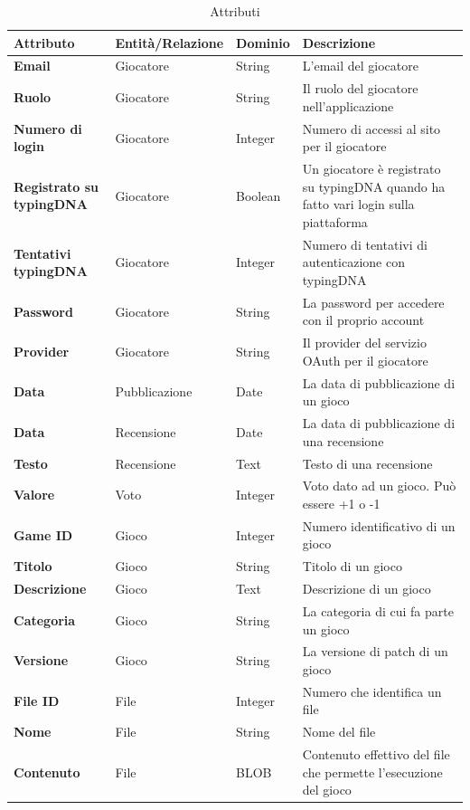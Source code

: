 \begin{table}[hbt!]
    \centering
    \begin{tabular}{m{} m{} m{} m{}}
        \hline
        \textbf{Attributo} & \textbf{Entità/Relazione} & \textbf{Dominio} & \textbf{Descrizione} \\
        \hline
        \textbf{Email} & Giocatore & String & L'email del giocatore \\
        \hline
        \textbf{Ruolo} & Giocatore & String & Il ruolo del giocatore nell'applicazione \\
        \hline
        \textbf{Numero di login} & Giocatore & Integer & Numero di accessi al sito per il giocatore \\
        \hline
        \textbf{Registrato su typingDNA} & Giocatore & Boolean & Un giocatore è registrato su typingDNA quando ha fatto vari login sulla piattaforma \\
        \hline
        \textbf{Tentativi typingDNA} & Giocatore & Integer & Numero di tentativi di autenticazione con typingDNA \\
        \hline
        \textbf{Password} & Giocatore & String & La password per accedere con il proprio account \\
        \hline
        \textbf{Provider} & Giocatore & String & Il provider del servizio OAuth per il giocatore \\
        \hline
        \textbf{Data} & Pubblicazione & Date & La data di pubblicazione di un gioco \\
        \hline
        \textbf{Data} & Recensione & Date & La data di pubblicazione di una recensione  \\
        \hline
        \textbf{Testo} & Recensione & Text & Testo di una recensione \\
        \hline
        \textbf{Valore} & Voto & Integer & Voto dato ad un gioco. Può essere +1 o -1 \\
        \hline
        \textbf{Game ID} & Gioco & Integer & Numero identificativo di un gioco \\
        \hline
        \textbf{Titolo} & Gioco & String & Titolo di un gioco \\
        \hline
        \textbf{Descrizione} & Gioco & Text & Descrizione di un gioco \\
        \hline
        \textbf{Categoria} & Gioco & String & La categoria di cui fa parte un gioco \\
        \hline
        \textbf{Versione} & Gioco & String & La versione di patch di un gioco \\
        \hline
        \textbf{File ID} & File & Integer & Numero che identifica un file \\
        \hline
        \textbf{Nome} & File & String & Nome del file \\
        \hline
        \textbf{Contenuto} & File & BLOB & Contenuto effettivo del file che permette l'esecuzione del gioco \\
    \end{tabular}
    \caption{Attributi}
\end{table}

